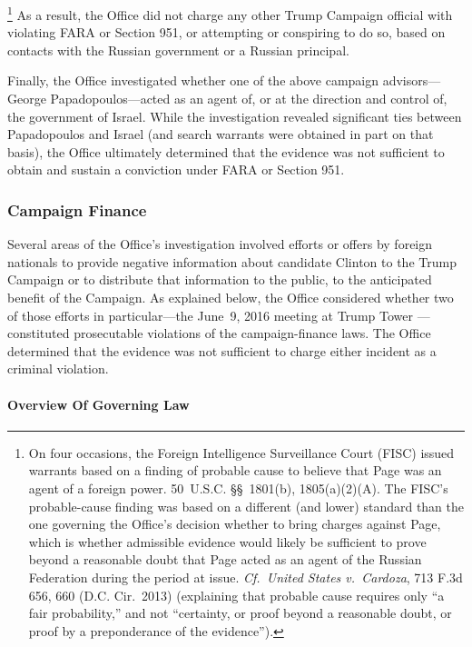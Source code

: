 \footnote{On four occasions, the Foreign Intelligence Surveillance Court (FISC) issued warrants based on a finding of probable cause to believe that Page was an agent of a foreign power.
50~U.S.C. \S\S~1801(b), 1805(a)(2)(A).
The FISC's probable-cause finding was based on a different (and lower) standard than the one governing the Office's decision whether to bring charges against Page, which is whether admissible evidence would likely be sufficient to prove beyond a reasonable doubt that Page acted as an agent of the Russian Federation during the period at issue.
\textit{Cf.~United States v.\ Cardoza}, 713 F.3d 656, 660 (D.C. Cir.~2013) (explaining that probable cause requires only ``a fair probability,'' and not ``certainty, or proof beyond a reasonable doubt, or proof by a preponderance of the evidence'').}
As a result, the Office did not charge  any other Trump Campaign official with violating FARA or Section 951, or attempting or conspiring to do so, based on contacts with the Russian government or a Russian principal.

Finally, the Office investigated whether one of the above campaign advisors---George Papadopoulos---acted as an agent of, or at the direction and control of, the government of Israel.
While the investigation revealed significant ties between Papadopoulos and Israel (and search warrants were obtained in part on that basis), the Office ultimately determined that the evidence was not sufficient to obtain and sustain a conviction under FARA or Section 951.

\subsubsection{Campaign Finance}
Several areas of the Office's investigation involved efforts or offers by foreign nationals to provide negative information about candidate Clinton to the Trump Campaign or to distribute that information to the public, to the anticipated benefit of the Campaign.
As explained below, the Office considered whether two of those efforts in particular---the June~9, 2016 meeting at Trump Tower ---constituted prosecutable violations of the campaign-finance laws.
The Office determined that the evidence was not sufficient to charge either incident as a criminal violation.

\paragraph{Overview Of Governing Law}

